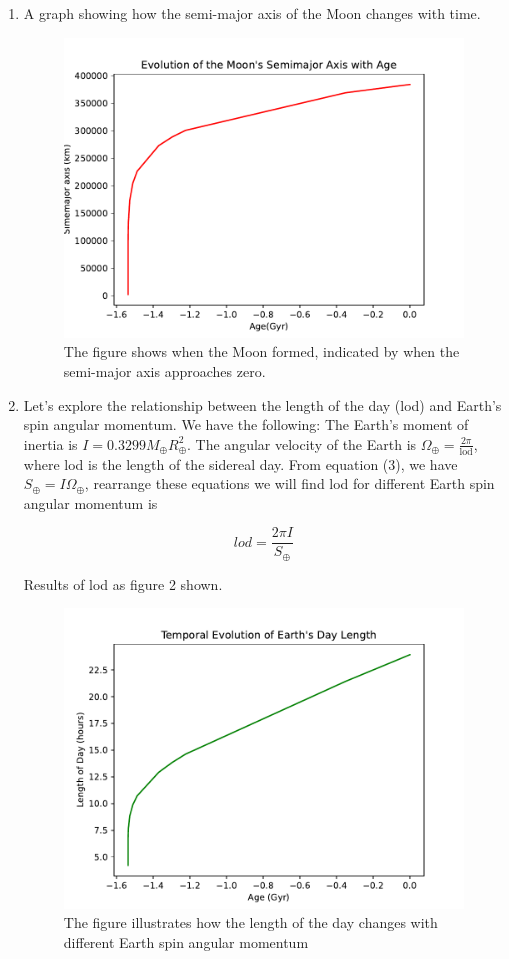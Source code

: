 \documentclass[12pt, letterpaper] {article}
\begin{document}
\begin{enumerate}
    \clearpage
    
    \item A graph showing how the semi-major axis of the Moon changes with time.

    \begin{figure}[h!]
        \centering
        \includegraphics[width=0.45\linewidth, keepaspectratio]{age.pdf}
        \caption{The figure shows when the Moon formed, indicated by when the semi-major axis approaches zero.}
        \label{fig: "Evolution of the Moon's Semimajor Axis with Age"}
    \end{figure}
    
    \item Let's explore the relationship between the length of the day (lod) and Earth's spin angular momentum. We have the following:
    The Earth's moment of inertia is $I = 0.3299M_\oplus R_\oplus^2$. The angular velocity of the Earth is $\Omega_\oplus = \frac{2\pi}{\text{lod}}$, where lod is the length of the sidereal day. From equation (3), we have $S_\oplus = I\Omega_\oplus$, rearrange these equations we will find lod for different Earth spin angular momentum is 
    
    \begin{equation}
        lod = {\frac{{2\pi}{I}}{S_\oplus}}
    \end{equation}
    
    Results of lod as figure 2 shown.

    \begin{figure}[h!]
        \centering
        \includegraphics[width=0.45\linewidth, keepaspectratio]{lod.pdf}
        \caption{The figure illustrates how the length of the day changes with different Earth spin angular momentum}
        \label{fig: "Temporal Evolution of Earth's Day Length"}
    \end{figure}


\end{enumerate}
\end{document}
